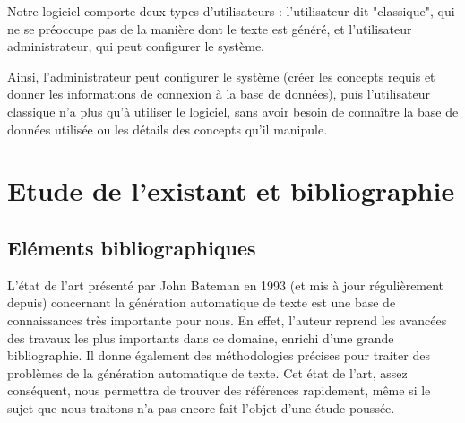 \documentclass[12pt]{report}
\begin{document}
\bigskip

Notre logiciel comporte deux types d'utilisateurs : l'utilisateur dit "classique", qui ne se préoccupe pas de la manière dont le texte est généré, et l'utilisateur administrateur, qui peut configurer le système.

Ainsi, l'administrateur peut configurer le système (créer les concepts requis et donner les informations de connexion à la base de données), puis l'utilisateur classique n'a plus qu'à utiliser le logiciel, sans avoir besoin de connaître la base de données utilisée ou les détails des concepts qu'il manipule.


\chapter{Etude de l'existant et bibliographie}

\section{Eléments bibliographiques}

L'état de l'art \cite{Bat93} présenté par John Bateman en 1993 (et mis à jour régulièrement depuis) concernant la génération automatique de texte est une base de connaissances très importante pour nous. En effet, l'auteur reprend les avancées des travaux les plus importants dans ce domaine, enrichi d'une grande bibliographie. Il donne également des méthodologies précises pour traiter des problèmes de la génération automatique de texte.
Cet état de l'art, assez conséquent, nous permettra de trouver des références rapidement, même si le sujet que nous traitons n'a pas encore fait l'objet d'une étude poussée.
\end{document}
